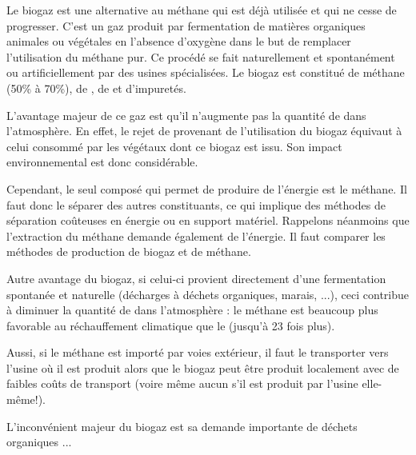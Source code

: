 \documentclass[10pt,a4paper]{article}
\begin{document}
\newpage

Le biogaz est une alternative au méthane qui est déjà utilisée et qui ne cesse de progresser. C'est un gaz produit par fermentation de matières organiques animales ou végétales en l'absence d'oxygène dans le but de remplacer l'utilisation du méthane pur. Ce procédé se fait naturellement et spontanément ou artificiellement par des usines spécialisées. Le biogaz est constitué de méthane (50\% à 70\%), de , de  et d'impuretés. 

L'avantage majeur de ce gaz est qu'il n'augmente pas la quantité de  dans l'atmosphère. En effet, le rejet de  provenant de l'utilisation du biogaz équivaut à celui consommé par les végétaux dont ce biogaz est issu. Son impact environnemental est donc considérable.

Cependant, le seul composé qui permet de produire de l'énergie est le méthane. Il faut donc le séparer des autres constituants, ce qui implique des méthodes de séparation coûteuses en énergie ou en support matériel. Rappelons néanmoins que l'extraction du méthane demande également de l'énergie. Il faut comparer les méthodes de production de biogaz et de méthane.

Autre avantage du biogaz, si celui-ci provient directement d'une fermentation spontanée et naturelle (décharges à déchets organiques, marais, ...), ceci contribue à diminuer la quantité de  dans l'atmosphère : le méthane est beaucoup plus favorable au réchauffement climatique que le  (jusqu'à 23 fois plus).

Aussi, si le méthane est importé par voies extérieur, il faut le transporter vers l'usine où il est produit alors que le biogaz peut être produit localement avec de faibles coûts de transport (voire même aucun s'il est produit par l'usine elle-même!).

L'inconvénient majeur du biogaz est sa demande importante de déchets organiques ...
\end{document}

